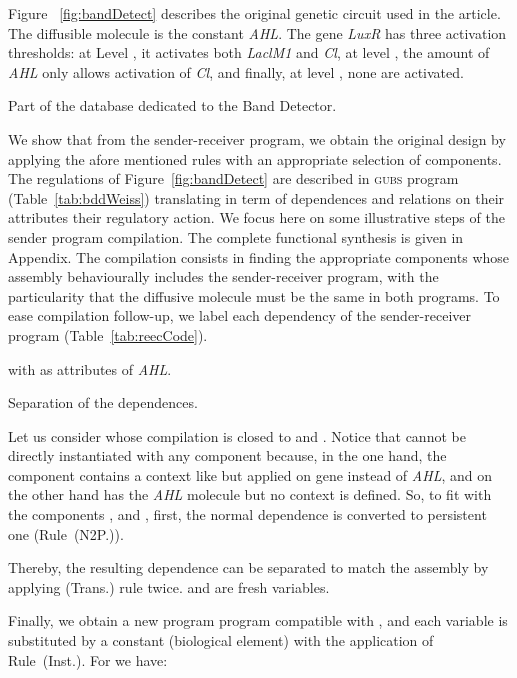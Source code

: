 \documentclass{eptcs}
\newcounter{ti}
\begin{document}
Figure ~\ref{fig:bandDetect} describes the original genetic circuit used in the article. The diffusible molecule is the constant \emph{AHL}.
The gene \textit{LuxR} has three activation thresholds: at Level , it activates both \textit{LaclM1} and \textit{Cl}, at level , the amount of \textit{AHL} only allows activation of \textit{Cl}, and finally, at level , none are activated.
\begin{table}[ht]
\footnotesize
\centering

\caption{Part of the database dedicated to the Band Detector.}
\label{tab:bddWeiss}
\end{table}
We show that from the sender-receiver program, we obtain the original design by applying the afore mentioned rules
 with an appropriate selection of components. The regulations of Figure~\ref{fig:bandDetect} are described in \textsc{gubs} program
(Table~\ref{tab:bddWeiss}) translating in term of dependences and relations on their attributes their regulatory action. We focus here on some illustrative steps of the sender program compilation. The complete functional synthesis is given in Appendix. The compilation consists in finding the appropriate components whose assembly behaviourally includes the sender-receiver program, with the particularity that the diffusive molecule must be the same in both programs. To ease compilation follow-up, we label each dependency of the sender-receiver program (Table~\ref{tab:reecCode}).
\begin{table}[t]
\scriptsize
\centering

with  as attributes of \textit{AHL}.
\caption{Separation of the dependences.}
\label{tab:reecCode}
\end{table}
Let us consider  whose compilation is closed to  and . Notice that  cannot be directly instantiated with any component because, in the one hand, the component  contains a context like  but applied on gene  instead of \textit{AHL}, and on the other hand  has the \textit{AHL} molecule but no context is defined. So, to fit  with the components ,  and , first, the normal dependence is converted to persistent one (Rule~(N2P.)).

Thereby, the resulting dependence can be separated to match the assembly  by applying (Trans.) rule twice.  and  are fresh variables.

Finally, we obtain a new program program  compatible with , and
each variable is substituted by a constant (biological element) with the application of Rule~(Inst.). For  we have:
\end{document}
